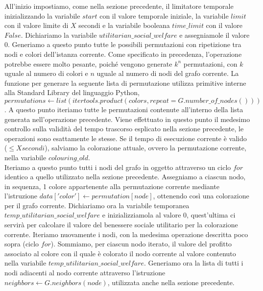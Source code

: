 \newpage
All'inizio impostiamo, come nella sezione precedente, il limitatore temporale inizializzando la variabile $start$ con il valore temporale iniziale, la variabile $limit$ con il valore limite di $X$ secondi e la variabile booleana $time\_limit$ con il valore $False$. Dichiariamo la variabile $utilitarian\_social\_welfare$ e assegniamole il valore $0$. Generiamo a questo punto tutte le possibili permutazioni con ripetizione tra nodi e colori dell'istanza corrente. Come specificato in precedenza, l'operazione potrebbe essere molto pesante, poiché vengono generate \(k^n\) permutazioni, con $k$ uguale al numero di colori e $n$ uguale al numero di nodi del grafo corrente. La funzione per generare la seguente lista di permutazione utilizza primitive interne alla Standard Library del linguaggio Python, $permutations\gets list(itertools.product(colors, repeat=G.number\_of\_nodes()))$. A questo punto iteriamo tutte le permutazioni contenute all'interno della lista generata nell'operazione precedente. Viene effettuato in questo punto il medesimo controllo sulla validità del tempo trascorso esplicato nella sezione precedente, le operazioni sono esattamente le stesse. Se il tempo di esecuzione corrente è valido (\(\leq X secondi\)), salviamo la colorazione attuale, ovvero la permutazione corrente, nella variabile $colouring\_old$.\\
Iteriamo a questo punto tutti i nodi del grafo in oggetto attraverso un ciclo $for$ identico a quello utilizzato nella sezione precedente. Assegniamo a ciascun nodo, in sequenza, 1 colore appartenente alla permutazione corrente mediante l'istruzione $data['color']\gets permutation[node]$, ottenendo così una colorazione per il grafo corrente. Dichiariamo ora la variabile temporanea $temp\_utilitarian\_social\_welfare$ e inizializziamola al valore $0$, quest'ultima ci servirà per calcolare il valore del benessere sociale utilitario per la colorazione corrente. Iteriamo nuovamente i nodi, con la medesima operazione descritta poco sopra (ciclo $for$). Sommiamo, per ciascun nodo iterato, il valore del profitto associato al colore con il quale è colorato il nodo corrente al valore contenuto nella variabile $temp\_utilitarian\_social\_welfare$. Generiamo ora la lista di tutti i nodi adiacenti al nodo corrente attraverso l'istruzione $neighbors\gets G.neighbors(node)$, utilizzata anche nella sezione precedente.\\
